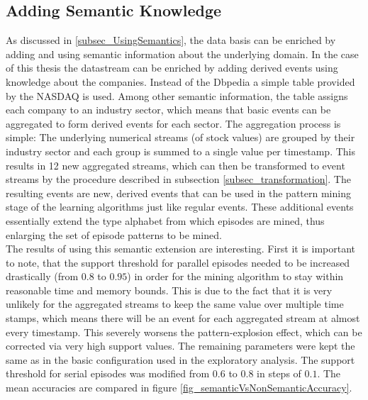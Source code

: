 \subsection{Adding Semantic Knowledge}
As discussed in \ref{subsec_UsingSemantics}, the data basis can be enriched by adding and using semantic information about the underlying domain. In the case of this thesis the datastream can be enriched by adding derived events using knowledge about the companies. Instead of the Dbpedia \cite{auer2007dbpedia} a simple table provided by the NASDAQ \cite{yahooFinance2} is used. Among other semantic information, the table assigns each company to an industry sector, which means that basic events can be aggregated to form derived events for each sector. The aggregation process is simple: The underlying numerical streams (of stock values) are grouped by their industry sector and each group is summed to a single value per timestamp. This results in 12 new aggregated streams, which can then be transformed to event streams by the procedure described in subsection \ref{subsec_transformation}. The resulting events are new, derived events that can be used in the pattern mining stage of the learning algorithms just like regular events. These additional events essentially extend the type alphabet from which episodes are mined, thus enlarging the set of episode patterns to be mined.\\
The results of using this semantic extension are interesting. First it is important to note, that the support threshold for parallel episodes needed to be increased drastically (from $0.8$ to $0.95$) in order for the mining algorithm to stay within reasonable time and memory bounds. This is due to the fact that it is very unlikely for the aggregated streams to keep the same value over multiple time stamps, which means there will be an event for each aggregated stream at almost every timestamp. This severely worsens the pattern-explosion effect, which can be corrected via very high support values. The remaining parameters were kept the same as in the basic configuration used in the exploratory analysis. The support threshold for serial episodes was modified from $0.6$ to $0.8$ in steps of $0.1$. The mean accuracies are compared in figure \ref{fig_semanticVsNonSemanticAccuracy}. 

